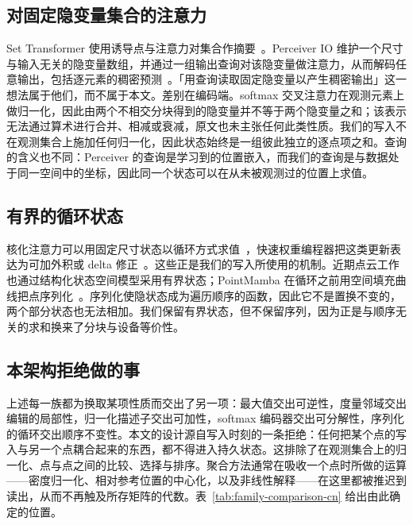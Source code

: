 \documentclass[UTF8,a4paper,11pt,fontset=windows]{ctexart}
\begin{document}
\subsection{对固定隐变量集合的注意力}
Set Transformer 使用诱导点与注意力对集合作摘要~\cite{lee2019settransformer}。Perceiver IO 维护一个尺寸与输入无关的隐变量数组，并通过一组输出查询对该隐变量做注意力，从而解码任意输出，包括逐元素的稠密预测~\cite{jaegle2022perceiverio}。「用查询读取固定隐变量以产生稠密输出」这一想法属于他们，而不属于本文。差别在编码端。softmax 交叉注意力在观测元素上做归一化，因此由两个不相交分块得到的隐变量并不等于两个隐变量之和；该表示无法通过算术进行合并、相减或衰减，原文也未主张任何此类性质。我们的写入不在观测集合上施加任何归一化，因此状态始终是一组彼此独立的逐点项之和。查询的含义也不同：Perceiver 的查询是学习到的位置嵌入，而我们的查询是与数据处于同一空间中的坐标，因此同一个状态可以在从未被观测过的位置上求值。

\subsection{有界的循环状态}
核化注意力可以用固定尺寸状态以循环方式求值~\cite{katharopoulos2020transformers}，快速权重编程器把这类更新表达为可加外积或 delta 修正~\cite{schlag2021linear}。这些正是我们的写入所使用的机制。近期点云工作也通过结构化状态空间模型采用有界状态；PointMamba 在循环之前用空间填充曲线把点序列化~\cite{liang2024pointmamba}。序列化使隐状态成为遍历顺序的函数，因此它不是置换不变的，两个部分状态也无法相加。我们保留有界状态，但不保留序列，因为正是与顺序无关的求和换来了分块与设备等价性。

\subsection{本架构拒绝做的事}
上述每一族都为换取某项性质而交出了另一项：最大值交出可逆性，度量邻域交出编辑的局部性，归一化描述子交出可加性，softmax 编码器交出可分解性，序列化的循环交出顺序不变性。本文的设计源自写入时刻的一条拒绝：任何把某个点的写入与另一个点耦合起来的东西，都不得进入持久状态。这排除了在观测集合上的归一化、点与点之间的比较、选择与排序。聚合方法通常在吸收一个点时所做的运算——密度归一化、相对参考位置的中心化，以及非线性解释——在这里都被推迟到读出，从而不再触及所存矩阵的代数。表~\ref{tab:family-comparison-cn} 给出由此确定的位置。
\end{document}
